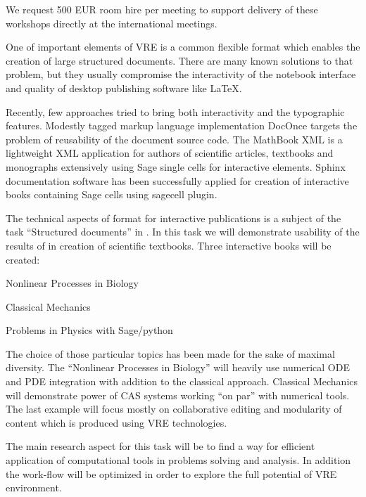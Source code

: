 \begin{workpackage}[id=dissem,wphases=18-48!.5,
  title=Dissemination,
  SARM=9,
  USORM=11,
  USHRM=8,
  USRM=24,
  UVRM=2
]
\begin{tasklist}
\begin{task}[title=\OOMMFNB{} open source dissemination workshops,
id=dissemination-of-oommf-nb-workshops]
  We request 500 EUR room hire per meeting to support delivery of
  these workshops directly at the international meetings.
\end{task}


\begin{task}[title=Demonstrator: interactive books,
id=ibook]

One of important elements of VRE is a common flexible format which
enables the creation of large structured documents. There are many
known solutions to that problem, but they usually compromise the
interactivity of the notebook interface and quality of desktop
publishing software like LaTeX. 

Recently, few approaches tried to bring both interactivity and the
typographic features. Modestly tagged markup language implementation
DocOnce targets the problem of reusability of the document source
code. The MathBook XML is a lightweight XML application for authors of
scientific articles, textbooks and monographs extensively using Sage
single cells for interactive elements. Sphinx documentation software
has been successfully applied for creation of interactive books
containing Sage cells using sagecell plugin. 

The technical aspects of format for interactive publications is a
subject of the task ``Structured documents'' in
. In this task we will demonstrate usability
of the results of  in creation of scientific
textbooks. Three interactive books will be created:

\begin{compactitem}
\item Nonlinear Processes in Biology 
\item Classical Mechanics  
\item Problems  in Physics with Sage/python    
\end{compactitem}

The choice of those particular topics has been made for the sake of maximal diversity. The ``Nonlinear Processes in Biology'' will heavily use numerical ODE and PDE integration with addition to the classical approach. Classical Mechanics will demonstrate power of CAS systems working ``on par'' with numerical tools. The last example will focus mostly on collaborative editing and modularity of content which is produced using VRE technologies. 

The main research aspect for this task will be to find a way for efficient application of computational tools in problems solving and analysis. In addition the work-flow will be optimized in order to explore the full potential of VRE environment. 


\end{task}
\end{tasklist}
\end{workpackage}
